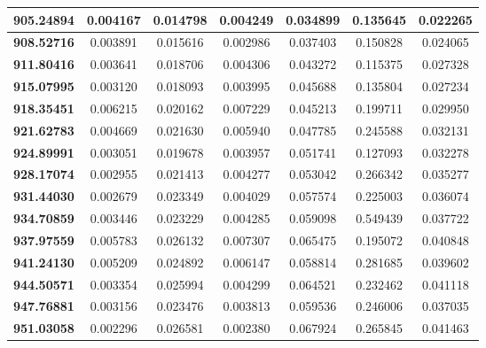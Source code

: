 \documentclass[10pt, a4paper]{article}
\begin{document}
\begin{appendices}
\begin{longtable}{|c|c|c|c|c|c|c|}
\textbf{905.24894} & 0.004167 & 0.014798 & 0.004249 & 0.034899 & 0.135645 & 0.022265 \\ \hline
\textbf{908.52716} & 0.003891 & 0.015616 & 0.002986 & 0.037403 & 0.150828 & 0.024065 \\ \hline
\textbf{911.80416} & 0.003641 & 0.018706 & 0.004306 & 0.043272 & 0.115375 & 0.027328 \\ \hline
\textbf{915.07995} & 0.003120 & 0.018093 & 0.003995 & 0.045688 & 0.135804 & 0.027234 \\ \hline
\textbf{918.35451} & 0.006215 & 0.020162 & 0.007229 & 0.045213 & 0.199711 & 0.029950 \\ \hline
\textbf{921.62783} & 0.004669 & 0.021630 & 0.005940 & 0.047785 & 0.245588 & 0.032131 \\ \hline
\textbf{924.89991} & 0.003051 & 0.019678 & 0.003957 & 0.051741 & 0.127093 & 0.032278 \\ \hline
\textbf{928.17074} & 0.002955 & 0.021413 & 0.004277 & 0.053042 & 0.266342 & 0.035277 \\ \hline
\textbf{931.44030} & 0.002679 & 0.023349 & 0.004029 & 0.057574 & 0.225003 & 0.036074 \\ \hline
\textbf{934.70859} & 0.003446 & 0.023229 & 0.004285 & 0.059098 & 0.549439 & 0.037722 \\ \hline
\textbf{937.97559} & 0.005783 & 0.026132 & 0.007307 & 0.065475 & 0.195072 & 0.040848 \\ \hline
\textbf{941.24130} & 0.005209 & 0.024892 & 0.006147 & 0.058814 & 0.281685 & 0.039602 \\ \hline
\textbf{944.50571} & 0.003354 & 0.025994 & 0.004299 & 0.064521 & 0.232462 & 0.041118 \\ \hline
\textbf{947.76881} & 0.003156 & 0.023476 & 0.003813 & 0.059536 & 0.246006 & 0.037035 \\ \hline
\textbf{951.03058} & 0.002296 & 0.026581 & 0.002380 & 0.067924 & 0.265845 & 0.041463 \\ \hline
\end{longtable}
\pagebreak


\end{appendices}
\end{document}
